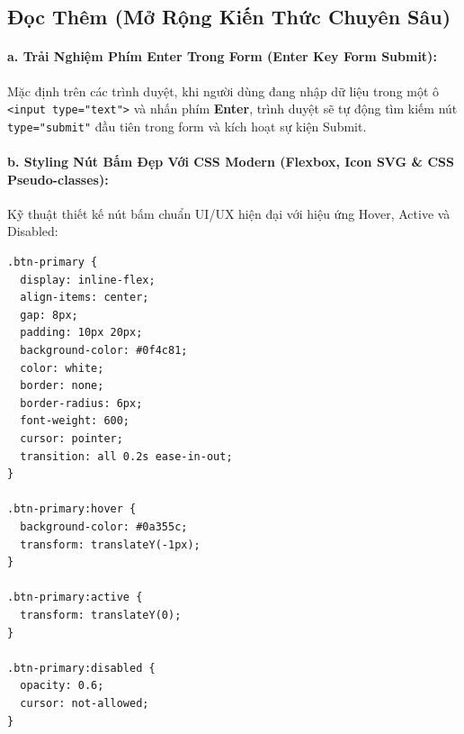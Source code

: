 \documentclass[11pt,oneside]{book}
\newcommand{\codeinline}[1]{\textcolor{accentOrange}{\texttt{#1}}}
\begin{document}
\subsection{Đọc Thêm (Mở Rộng Kiến Thức Chuyên Sâu)}
\label{subsec:buttons_advanced_readmore}

\paragraph{a. Trải Nghiệm Phím Enter Trong Form (Enter Key Form Submit):}
Mặc định trên các trình duyệt, khi người dùng đang nhập dữ liệu trong một ô \codeinline{<input type="text">} và nhấn phím \textbf{Enter}, trình duyệt sẽ tự động tìm kiếm nút \codeinline{type="submit"} đầu tiên trong form và kích hoạt sự kiện Submit.

\paragraph{b. Styling Nút Bấm Đẹp Với CSS Modern (Flexbox, Icon SVG \& CSS Pseudo-classes):}
Kỹ thuật thiết kế nút bấm chuẩn UI/UX hiện đại với hiệu ứng Hover, Active và Disabled:

\begin{codeWindow}
\begin{lstlisting}[language=HTML5]
.btn-primary {
  display: inline-flex;
  align-items: center;
  gap: 8px;
  padding: 10px 20px;
  background-color: #0f4c81;
  color: white;
  border: none;
  border-radius: 6px;
  font-weight: 600;
  cursor: pointer;
  transition: all 0.2s ease-in-out;
}

.btn-primary:hover {
  background-color: #0a355c;
  transform: translateY(-1px);
}

.btn-primary:active {
  transform: translateY(0);
}

.btn-primary:disabled {
  opacity: 0.6;
  cursor: not-allowed;
}
\end{lstlisting}
\end{codeWindow}

\begin{browserWindow}
\sffamily\small
{} \qquad
{}
\end{browserWindow}
\end{document}
